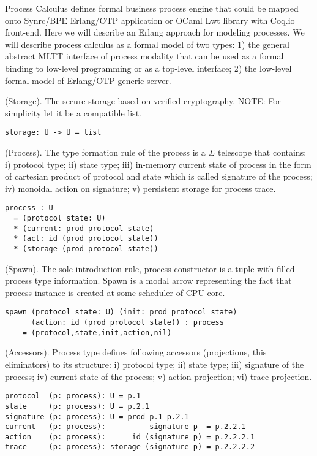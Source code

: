 Process Calculus defines formal business process engine that could be mapped onto Synrc/BPE Erlang/OTP application or OCaml Lwt library with Coq.io front-end. Here we will describe an Erlang approach for modeling processes.
We will describe process calculus as a formal model of two types: 1) the general abstract MLTT interface of process modality that can be used as a formal binding to low-level programming or as a top-level interface; 2) the low-level formal model of Erlang/OTP generic server.

\begin{definition} (Storage).
The secure storage based on verified cryptography.
NOTE: For simplicity let it be a compatible list.
\begin{lstlisting}
storage: U -> U = list
\end{lstlisting}
\end{definition}

\begin{definition} (Process).
The type formation rule of the process
is a $\Sigma$ telescope that contains: i) protocol type; ii) state type;
iii) in-memory current state of process in the form of cartesian product
of protocol and state which is called signature of the process; iv) monoidal
action on signature; v) persistent storage for process trace.
\begin{lstlisting}
process : U
  = (protocol state: U)
  * (current: prod protocol state)
  * (act: id (prod protocol state))
  * (storage (prod protocol state))
\end{lstlisting}
\end{definition}

\begin{definition} (Spawn).
The sole introduction rule, process constructor
is a tuple with filled process type information. Spawn is a modal arrow
representing the fact that process instance is created at some
scheduler of CPU core.
\begin{lstlisting}
spawn (protocol state: U) (init: prod protocol state)
      (action: id (prod protocol state)) : process
    = (protocol,state,init,action,nil)
\end{lstlisting}
\end{definition}

\begin{definition} (Accessors). Process type defines following
accessors (projections, this eliminators) to its structure:
i) protocol type; ii) state type; iii) signature of the
process; iv) current state of the process; v) action
projection; vi) trace projection.
\begin{lstlisting}
protocol  (p: process): U = p.1
state     (p: process): U = p.2.1
signature (p: process): U = prod p.1 p.2.1
current   (p: process):          signature p  = p.2.2.1
action    (p: process):      id (signature p) = p.2.2.2.1
trace     (p: process): storage (signature p) = p.2.2.2.2
\end{lstlisting}
\end{definition}

